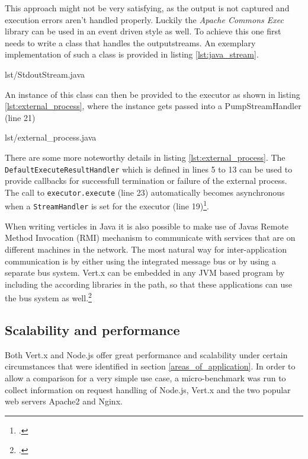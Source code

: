 This approach might not be very satisfying, as the output is not captured and
execution errors aren't handled properly. Luckily the \textit{Apache Commons Exec} library
can be used in an event driven style as well. To achieve this one first needs to
write a class that handles the outputstreams.
An exemplary implementation of such a class is provided in listing
\ref{lst:java_stream}.

%
{lst/StdoutStream.java}

An instance of this class can then be provided to the executor as shown in
listing \ref{lst:external_process}, where the instance gets passed into a PumpStreamHandler (line 21)

%
{lst/external_process.java}

There are some more noteworthy details in listing \ref{lst:external_process}.
The \texttt{DefaultExecuteResultHandler} which is defined in lines 5 to
13 can be used to provide callbacks for successfull termination or failure of
the external process. The call to \texttt{executor.execute} (line 23) automatically becomes
asynchronous when a \texttt{StreamHandler} is set for the executor (line 19)\footcite[Cf.][]{apache_2010}.



When writing verticles in Java it is also possible to make use of Javas Remote
Method Invocation (RMI) mechanism to communicate with services that are on different
machines in the network.
The most natural way for inter-application communication is by either using the
integrated message bus or by using a separate bus system.
Vert.x can be embedded in any JVM based program by including the according
libraries in the path, so that these applications can use the bus system as
well.\footcite[Cf.][]{vertx_2012}



\subsection{Scalability and performance}
\label{scalability}



Both Vert.x and Node.js offer great performance and scalability under certain
circumstances that were identified in section \ref{areas_of_application}.
In order to allow a comparison for a very simple use case, a micro-benchmark was
run to collect information on request handling of Node.js, Vert.x and the two
popular web servers Apache2 and Nginx.
